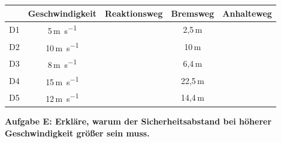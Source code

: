 \documentclass[11pt,a4paper]{article}
\newcommand{\aufgabe}[1]{\noindent\textbf{\textcolor{fachfarbe}{#1}}}
\begin{document}
\vspace{0.2em}
{\small
\renewcommand{\arraystretch}{1}
\begin{tabular}{|c|c|c|c|c|}
\hline
& \textbf{Geschwindigkeit} & \textbf{Reaktionsweg} & \textbf{Bremsweg} & \textbf{Anhalteweg} \\
\hline
D1 & 5\,\si{\metre\per\second} & & 2,5\,m & \\[1.2cm]
\hline
D2 & 10\,\si{\metre\per\second} & & 10\,m & \\[1.2cm]
\hline
D3 & 8\,\si{\metre\per\second} & & 6,4\,m & \\[1.2cm]
\hline
D4 & 15\,\si{\metre\per\second} & & 22,5\,m & \\[1.2cm]
\hline
D5 & 12\,\si{\metre\per\second} & & 14,4\,m & \\[1.2cm]
\hline
\end{tabular}
}

\vspace{0.6em}

\aufgabe{Aufgabe E: Erkläre, warum der Sicherheitsabstand bei höherer Geschwindigkeit größer sein muss.}

\vspace{2cm}
\end{document}
